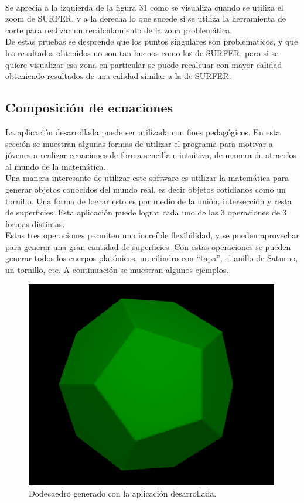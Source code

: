 \documentclass[12pt]{article}
\begin{document}
\\Se aprecia a la izquierda de la figura 31 como se visualiza cuando se utiliza el zoom de SURFER, y a la derecha lo que sucede si se utiliza la herramienta de corte para realizar un recálculamiento de la zona problemática. 
\\De estas pruebas se desprende que los puntos singulares son problematicos, y que los resultados obtenidos no son tan buenos como los de SURFER, pero si se quiere visualizar esa zona en particular se puede recalcuar con mayor calidad obteniendo resultados de una calidad similar a la de SURFER.
\clearpage
\subsection{Composición de ecuaciones}
La aplicación desarrollada puede ser utilizada con fines pedagógicos. En esta sección se muestran algunas formas de utilizar el programa para motivar a jóvenes a realizar ecuaciones de forma sencilla e intuitiva, de manera de atraerlos al mundo de la matemática.
\\Una manera interesante de utilizar este software es utilizar la matemática para generar objetos conocidos del mundo real, es decir objetos cotidianos como un tornillo. Una forma de lograr esto es por medio de la unión, intersección y resta de superficies. Esta aplicación puede lograr cada uno de las 3 operaciones de 3 formas distintas.
\\Estas tres operaciones permiten una increíble flexibilidad, y se pueden aprovechar para generar una gran cantidad de superficies. Con estas operaciones se pueden generar todos los cuerpos platónicos, un cilindro con “tapa”, el anillo de Saturno, un tornillo, etc. A continuación se muestran algunos ejemplos.\\
\begin{figure}
\includegraphics[width=0.9\linewidth]{dodecaedro.png} 
\caption{Dodecaedro generado con la aplicación desarrollada.}
\label{fig:subim1}
\end{figure}
\end{document}
